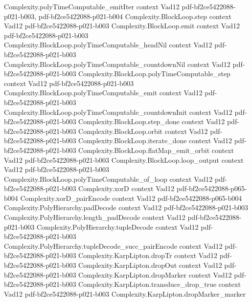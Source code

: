 \begin{theorem}
\proofstep
  {Complexity.polyTimeComputable_emitIter}
  {context}
  {Vad12}
  {pdf-bf2ce5422088-p021-b003,
    pdf-bf2ce5422088-p021-b004}
\proofstep
  {Complexity.BlockLoop.step}
  {context}
  {Vad12}
  {pdf-bf2ce5422088-p021-b003}
\proofstep
  {Complexity.BlockLoop.emit}
  {context}
  {Vad12}
  {pdf-bf2ce5422088-p021-b003}
\proofstep
  {Complexity.BlockLoop.polyTimeComputable_headNil}
  {context}
  {Vad12}
  {pdf-bf2ce5422088-p021-b003}
\proofstep
  {Complexity.BlockLoop.polyTimeComputable_countdownNil}
  {context}
  {Vad12}
  {pdf-bf2ce5422088-p021-b003}
\proofstep
  {Complexity.BlockLoop.polyTimeComputable_step}
  {context}
  {Vad12}
  {pdf-bf2ce5422088-p021-b003}
\proofstep
  {Complexity.BlockLoop.polyTimeComputable_emit}
  {context}
  {Vad12}
  {pdf-bf2ce5422088-p021-b003}
\proofstep
  {Complexity.BlockLoop.polyTimeComputable_countdownInit}
  {context}
  {Vad12}
  {pdf-bf2ce5422088-p021-b003}
\proofstep
  {Complexity.BlockLoop.step_done}
  {context}
  {Vad12}
  {pdf-bf2ce5422088-p021-b003}
\proofstep
  {Complexity.BlockLoop.orbit}
  {context}
  {Vad12}
  {pdf-bf2ce5422088-p021-b003}
\proofstep
  {Complexity.BlockLoop.iterate_done}
  {context}
  {Vad12}
  {pdf-bf2ce5422088-p021-b003}
\proofstep
  {Complexity.BlockLoop.flatMap_emit_orbit}
  {context}
  {Vad12}
  {pdf-bf2ce5422088-p021-b003}
\proofstep
  {Complexity.BlockLoop.loop_output}
  {context}
  {Vad12}
  {pdf-bf2ce5422088-p021-b003}
\proofstep
  {Complexity.BlockLoop.polyTimeComputable_of_loop}
  {context}
  {Vad12}
  {pdf-bf2ce5422088-p021-b003}
\proofstep
  {Complexity.xorD}
  {context}
  {Vad12}
  {pdf-bf2ce5422088-p065-b004}
\proofstep
  {Complexity.xorD_pairEncode}
  {context}
  {Vad12}
  {pdf-bf2ce5422088-p065-b004}
\proofstep
  {Complexity.PolyHierarchy.padDecode}
  {context}
  {Vad12}
  {pdf-bf2ce5422088-p021-b003}
\proofstep
  {Complexity.PolyHierarchy.length_padDecode}
  {context}
  {Vad12}
  {pdf-bf2ce5422088-p021-b003}
\proofstep
  {Complexity.PolyHierarchy.tupleDecode}
  {context}
  {Vad12}
  {pdf-bf2ce5422088-p021-b003}
\proofstep
  {Complexity.PolyHierarchy.tupleDecode_succ_pairEncode}
  {context}
  {Vad12}
  {pdf-bf2ce5422088-p021-b003}
\proofstep
  {Complexity.KarpLipton.dropTr}
  {context}
  {Vad12}
  {pdf-bf2ce5422088-p021-b003}
\proofstep
  {Complexity.KarpLipton.dropOut}
  {context}
  {Vad12}
  {pdf-bf2ce5422088-p021-b003}
\proofstep
  {Complexity.KarpLipton.dropMarker}
  {context}
  {Vad12}
  {pdf-bf2ce5422088-p021-b003}
\proofstep
  {Complexity.KarpLipton.transduce_drop_true}
  {context}
  {Vad12}
  {pdf-bf2ce5422088-p021-b003}
\proofstep
  {Complexity.KarpLipton.dropMarker_marker}

\end{theorem}
